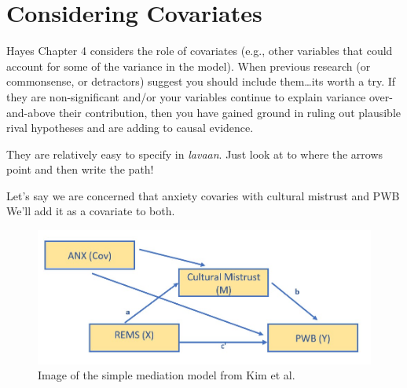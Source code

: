 \documentclass[
  11pt,
]{book}
\begin{document}
\hypertarget{considering-covariates}{%
\section{Considering Covariates}\label{considering-covariates}}

Hayes Chapter 4 \citeyearpar{hayes_introduction_2018} considers the role of covariates (e.g., other variables that could account for some of the variance in the model). When previous research (or commonsense, or detractors) suggest you should include them\ldots its worth a try. If they are non-significant and/or your variables continue to explain variance over-and-above their contribution, then you have gained ground in ruling out plausible rival hypotheses and are adding to causal evidence.

They are relatively easy to specify in \emph{lavaan}. Just look at to where the arrows point and then write the path!

Let's say we are concerned that anxiety covaries with cultural mistrust and PWB We'll add it as a covariate to both.

\begin{figure}
\centering
\includegraphics{images/SimpleMed/Kim_wCovs.jpg}
\caption{Image of the simple mediation model from Kim et al.}
\end{figure}
\end{document}
